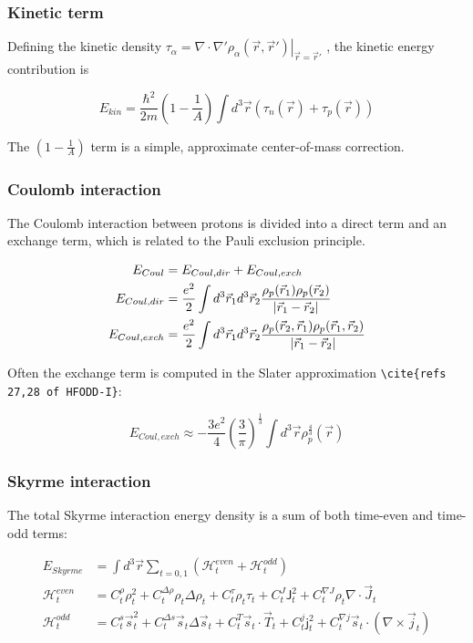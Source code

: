 \subsubsection{Kinetic term}

Defining the kinetic density $\tau_\alpha = \left.\nabla\cdot\nabla'\rho_\alpha(\vec{r},\vec{r}')\right|_{\vec{r}=\vec{r}'}$ , the kinetic energy contribution is

\begin{equation}
E_{kin} = \frac{\hbar^2}{2m} \left(1-\frac{1}{A}\right) \int d^3\vec{r} \left(\tau_n(\vec{r}) + \tau_p(\vec{r}) \right)
\end{equation}

\noindent The $\left(1-\frac{1}{A}\right)$ term is a simple, approximate center-of-mass correction.

\subsubsection{Coulomb interaction}
The Coulomb interaction between protons is divided into a direct term and an exchange term, which is related to the Pauli exclusion principle.

\begin{align}
E_{Coul} &= E_{Coul, dir} + E_{Coul, exch} \\
E_{Coul, dir}& = \frac{e^2}{2} \int d^3\vec{r}_1 d^3\vec{r}_2 \frac{\rho_p(\vec{r}_1)\rho_p(\vec{r}_2)}{\abs{\vec{r}_1-\vec{r}_2}} \\
E_{Coul, exch} &= \frac{e^2}{2} \int d^3\vec{r}_1 d^3\vec{r}_2 \frac{\rho_p(\vec{r}_2,\vec{r}_1)\rho_p(\vec{r}_1,\vec{r}_2)}{\abs{\vec{r}_1-\vec{r}_2}}
\end{align}

Often the exchange term is computed in the Slater approximation \verb|\cite{refs 27,28 of HFODD-I}|:

\begin{equation}
E_{Coul, exch} \approx -\frac{3e^2}{4} \left(\frac{3}{\pi}\right)^\frac{1}{3} \int d^3\vec{r} \rho_p^\frac{4}{3}(\vec{r})
\end{equation}

\subsubsection{Skyrme interaction}
The total Skyrme interaction energy density is a sum of both time-even and time-odd terms:

\begin{align}
E_{Skyrme} &= \int d^3\vec{r} \sum_{t=0,1} \left( \mathcal{H}^{even}_t + \mathcal{H}^{odd}_t \right)\\
\mathcal{H}^{even}_t &= C^\rho_t\rho_t^2 + C_t^{\Delta\rho}\rho_t\Delta\rho_t + C^\tau_t\rho_t\tau_t + C^J_t\mathsf{J}^2_t + C^{\nabla J}_t\rho_t\nabla\cdot\vec{J}_t \\
\mathcal{H}^{odd}_t &= C^s_t \vec{s}_t^2 + C_t^{\Delta s}\vec{s}_t\Delta\vec{s}_t + C^T_t\vec{s}_t\cdot\vec{T}_t + C^j_t\mathsf{j}^2_t + C^{\nabla j}_t\vec{s}_t\cdot(\nabla\times\vec{j}_t)
\end{align}

